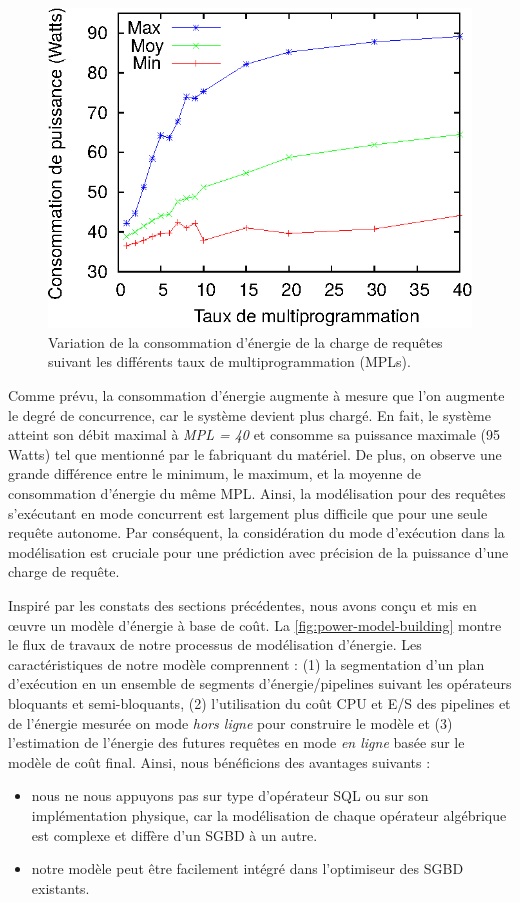\begin{figure}
 \centering
 \includegraphics[scale=0.9]{chapitre4/chap4Fig/mpls-power.eps}
 \caption{Variation de la consommation d'énergie de la charge de requêtes suivant les différents taux de multiprogrammation (MPLs).}
 \label{fig:mpls-power}
\end{figure}

Comme prévu, la consommation d'énergie augmente à mesure que l'on augmente le degré de concurrence, car le système devient plus chargé. En fait, le système atteint son débit maximal à \textit{MPL = 40} et consomme sa puissance maximale (95 Watts) tel que mentionné par le fabriquant du matériel. De plus, on observe une grande différence entre le minimum, le maximum, et la moyenne de consommation d'énergie du même MPL. Ainsi, la modélisation pour des requêtes s'exécutant en mode concurrent est largement plus difficile que pour une seule requête autonome. Par conséquent, la considération du mode d'exécution dans la modélisation est cruciale pour une prédiction avec précision de la puissance d'une charge de requête.

Inspiré par les constats des sections précédentes, nous avons conçu et mis en œuvre un modèle d'énergie à base de coût. %
La \ref{fig:power-model-building} montre le flux de travaux de notre processus de modélisation d'énergie.
Les caractéristiques de notre modèle comprennent : (1) la segmentation d'un plan d'exécution en un ensemble de segments d'énergie/pipelines suivant les opérateurs bloquants et semi-bloquants, (2) l'utilisation du coût CPU et E/S des pipelines et de l'énergie mesurée on mode \textit{hors ligne} pour construire le modèle et (3) l'estimation de l'énergie des futures requêtes en mode \textit{en ligne} basée sur le modèle de coût final. Ainsi, nous bénéficions des avantages suivants :
\begin{itemize}
 \item nous ne nous appuyons pas sur type d'opérateur SQL ou sur son implémentation physique, car la modélisation de chaque opérateur algébrique est complexe et diffère d'un SGBD à un autre.
 \item notre modèle peut être facilement intégré dans l'optimiseur des SGBD existants.
\end{itemize}

